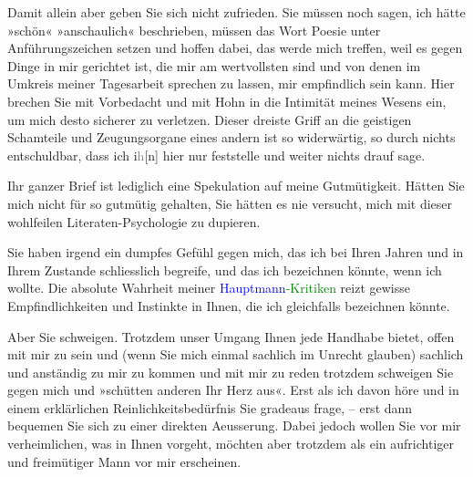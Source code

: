 \pstart
           Damit allein aber geben Sie sich nicht zufrieden. Sie müssen noch sagen, ich hätte
               »schön« »anschaulich« beschrieben, müssen das Wort Poesie unter Anführungszeichen
               setzen und hoffen dabei, das werde mich treffen, weil es gegen Dinge in mir gerichtet
               ist, die mir am wertvollsten sind und von denen im Umkreis meiner Tagesarbeit
               sprechen zu lassen, mir empfindlich sein kann. {\pb}Hier brechen Sie mit Vorbedacht
               und mit Hohn in die Intimität meines Wesens ein, um mich desto sicherer zu verletzen.
               Dieser dreiste Griff an die geistigen Schamteile und Zeugungsorgane eines andern ist
               so widerwärtig, so durch nichts entschuldbar, dass ich i\textcolor{gray}{h}{[}n{]} hier nur feststelle und weiter nichts drauf sage.\pend
           
\pstart
           Ihr ganzer Brief ist lediglich eine Spekulation auf meine Gutmütigkeit. Hätten Sie
               mich nicht für so gutmütig gehalten, Sie hätten es nie versucht, mich mit dieser
               wohlfeilen Literaten-Psychologie zu dupieren.\pend
           
\pstart
           Sie haben irgend ein dumpfes Gefühl gegen mich, das ich bei Ihren Jahren und in Ihrem
               Zustande schliesslich begreife, und das ich bezeichnen könnte, wenn ich wollte. Die
               absolute Wahrheit meiner \textcolor{green}{\textcolor{blue}{Hauptmann}{}\ledrightnote{\textcolor{blue}{Gerhart Hauptmann}}-Kritiken}{}\ledrightnote{{$\rightarrow$}\textcolor{green}{Der Fall Hauptmann}{\newline}{$\rightarrow$}\textcolor{green}{Der Fall Brahm}} reizt gewisse
               Empfindlichkeiten und Instinkte in Ihnen, die ich gleichfalls bezeichnen könnte.\pend
           
\pstart
           Aber Sie schweigen. Trotzdem unser Umgang Ihnen jede Handhabe bietet, offen mit mir
               zu sein und (wenn Sie mich einmal sachlich im Unrecht glauben) sachlich und anständig
               zu mir zu kommen und mit mir zu reden {\dotstwo} trotzdem schweigen
               Sie gegen mich und »schütten anderen Ihr Herz aus«. Erst als ich davon höre und in
               einem erklärlichen Reinlichkeitsbedürfnis Sie gradeaus frage, – erst dann bequemen
               Sie sich zu einer direkten Aeusserung. Dabei jedoch wollen Sie vor mir verheimlichen,
               was in Ihnen vorgeht, möchten aber trotzdem als ein aufrichtiger und freimütiger Mann
               vor mir erscheinen.\pend
           
